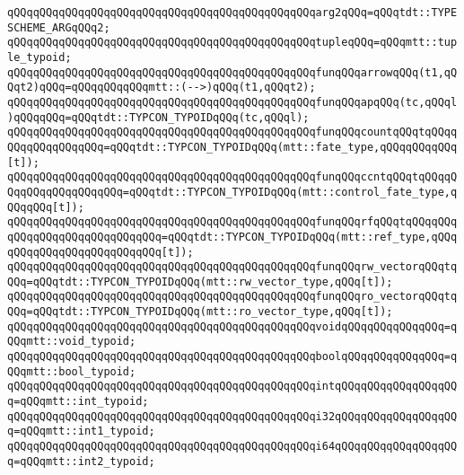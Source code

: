 \verb|qQQqqQQqqQQqqQQqqQQqqQQqqQQqqQQqqQQqqQQqqQQqqQQqarg2qQQq=qQQqtdt::TYPESCHEME_ARGqQQq2;|\newline
\newline
\verb|qQQqqQQqqQQqqQQqqQQqqQQqqQQqqQQqqQQqqQQqqQQqqQQqtupleqQQq=qQQqmtt::tuple_typoid;|\newline
\newline
\verb|qQQqqQQqqQQqqQQqqQQqqQQqqQQqqQQqqQQqqQQqqQQqqQQqfunqQQqarrowqQQq(t1,qQQqt2)qQQq=qQQqqQQqqQQqmtt::(-->)qQQq(t1,qQQqt2);|\newline
\newline
\verb|qQQqqQQqqQQqqQQqqQQqqQQqqQQqqQQqqQQqqQQqqQQqqQQqfunqQQqapqQQq(tc,qQQql)qQQqqQQq=qQQqtdt::TYPCON_TYPOIDqQQq(tc,qQQql);|\newline
\verb|qQQqqQQqqQQqqQQqqQQqqQQqqQQqqQQqqQQqqQQqqQQqqQQqfunqQQqcountqQQqtqQQqqQQqqQQqqQQqqQQq=qQQqtdt::TYPCON_TYPOIDqQQq(mtt::fate_type,qQQqqQQqqQQq[t]);|\newline
\verb|qQQqqQQqqQQqqQQqqQQqqQQqqQQqqQQqqQQqqQQqqQQqqQQqfunqQQqccntqQQqtqQQqqQQqqQQqqQQqqQQqqQQq=qQQqtdt::TYPCON_TYPOIDqQQq(mtt::control_fate_type,qQQqqQQq[t]);|\newline
\newline
\verb|qQQqqQQqqQQqqQQqqQQqqQQqqQQqqQQqqQQqqQQqqQQqqQQqfunqQQqrfqQQqtqQQqqQQqqQQqqQQqqQQqqQQqqQQqqQQq=qQQqtdt::TYPCON_TYPOIDqQQq(mtt::ref_type,qQQqqQQqqQQqqQQqqQQqqQQqqQQq[t]);|\newline
\verb|qQQqqQQqqQQqqQQqqQQqqQQqqQQqqQQqqQQqqQQqqQQqqQQqfunqQQqrw_vectorqQQqtqQQq=qQQqtdt::TYPCON_TYPOIDqQQq(mtt::rw_vector_type,qQQq[t]);|\newline
\verb|qQQqqQQqqQQqqQQqqQQqqQQqqQQqqQQqqQQqqQQqqQQqqQQqfunqQQqro_vectorqQQqtqQQq=qQQqtdt::TYPCON_TYPOIDqQQq(mtt::ro_vector_type,qQQq[t]);|\newline
\newline
\verb|qQQqqQQqqQQqqQQqqQQqqQQqqQQqqQQqqQQqqQQqqQQqqQQqvoidqQQqqQQqqQQqqQQq=qQQqmtt::void_typoid;|\newline
\verb|qQQqqQQqqQQqqQQqqQQqqQQqqQQqqQQqqQQqqQQqqQQqqQQqboolqQQqqQQqqQQqqQQq=qQQqmtt::bool_typoid;|\newline
\verb|qQQqqQQqqQQqqQQqqQQqqQQqqQQqqQQqqQQqqQQqqQQqqQQqintqQQqqQQqqQQqqQQqqQQq=qQQqmtt::int_typoid;|\newline
\newline
\verb|qQQqqQQqqQQqqQQqqQQqqQQqqQQqqQQqqQQqqQQqqQQqqQQqi32qQQqqQQqqQQqqQQqqQQq=qQQqmtt::int1_typoid;|\newline
\verb|qQQqqQQqqQQqqQQqqQQqqQQqqQQqqQQqqQQqqQQqqQQqqQQqi64qQQqqQQqqQQqqQQqqQQq=qQQqmtt::int2_typoid;|\newline
